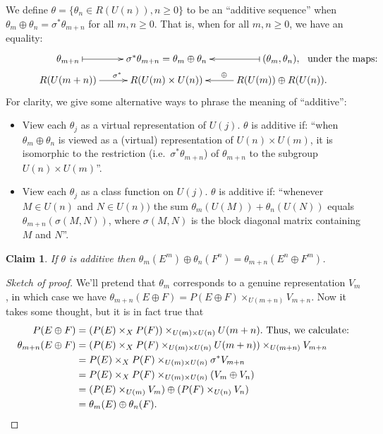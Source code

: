 \documentclass{article}
\newcommand{\from}{\leftarrow}
\renewcommand{\to}{\longrightarrow}
\renewcommand{\mapsto}{\longmapsto}
\newtheorem{claim}[thm]{Claim}
\theoremstyle{definition}
\begin{document}
We define $\theta = \{\theta_n \in R(U(n)), n \ge 0\}$ to be an ``additive sequence'' when $\theta_m \oplus \theta_n = \sigma^* \theta_{m+n}$ for all $m, n \ge 0$. That is, when for all $m,n\geq0$, we have an equality:
\[\xymatrix@R=2mm{
\theta_{m+n}\ar@{|->}[r]& \sigma^*\theta_{m+n}=\theta_m\oplus\theta_n&\ar@{|->}[l]
(\theta_m,\theta_n), \makebox[0mm][l]{\textup{ \ under the maps:} }\\
R(U(m+n)) \ar[r]^{\sigma^*}& R(U(m) \times U(n))&R(U(m))\oplus R(U(n))\ar[l]_\oplus .
}\]
For clarity, we give some alternative ways to phrase the meaning of ``additive'':
\begin{itemize}
\item View each $\theta_j$ as a virtual representation of $U(j)$. $\theta$ is additive if: ``when $\theta_m\oplus\theta_n$ is viewed as a (virtual) representation of $U(n)\times U(m)$, it is isomorphic to the restriction (i.e.\ $\sigma^*\theta_{m+n}$) of $\theta_{m+n}$ to the subgroup $U(n)\times U(m)$''.
\item View each $\theta_j$ as a class function on $U(j)$. $\theta$ is additive if: ``whenever $M\in U(n)$ and $N\in U(n))$ the sum $\theta_m(U(M))+\theta_n(U(N))$ equals $\theta_{m+n}(\sigma(M,N))$, where $\sigma(M,N)$ is the block diagonal matrix containing $M$ and $N$''.
\end{itemize}
\begin{claim}
If $\theta$ is additive then $\theta_m (E^m) \oplus \theta_n (F^n) = \theta_{m+n}(E^n \oplus F^m)$.
\end{claim}
\begin{proof}[Sketch of proof]
We'll pretend that $\theta_m$ corresponds to a genuine representation $V_m$, in which case we have $\theta_{m+n}(E \oplus F) = P(E \oplus F) \times_{U(m+n)} V_{m+n}$.  Now it takes some thought, but it is in fact true that
\begin{align*}
P(E \oplus F) & = (P(E) \times_X P(F)) \times_{U(m) \times U(n)} U(m + n). \text{ Thus, we calculate:}\\
\theta_{m+n}(E \oplus F) & = (P(E) \times_X P(F) \times_{U(m) \times U(n)} U(m+n)) \times_{U(m+n)} V_{m+n} \\
& = P(E) \times_X P(F) \times_{U(m) \times U(n)} \sigma^* V_{m+n} \\
& = P(E) \times_X P(F) \times_{U(m) \times U(n)} (V_m \oplus V_n) \\
& = (P(E) \times_{U(m)} V_m) \oplus (P(F) \times_{U(n)} V_n) \\
& = \theta_m (E) \oplus \theta_n (F).\qedhere
\end{align*}
\end{proof}
\end{document}
